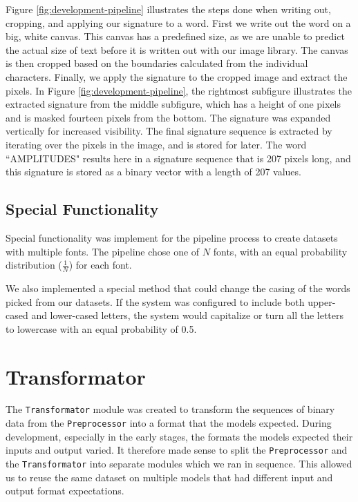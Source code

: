 Figure \ref{fig:development-pipeline} illustrates the steps done when writing out, cropping, and applying our signature to a word. First we write out the word on a big, white canvas. This canvas has a predefined size, as we are unable to predict the actual size of text before it is written out with our image library. The canvas is then cropped based on the boundaries calculated from the individual characters. Finally, we apply the signature to the cropped image and extract the pixels. In Figure \ref{fig:development-pipeline}, the rightmost subfigure illustrates the extracted signature from the middle subfigure, which has a height of one pixels and is masked fourteen pixels from the bottom. The signature was expanded vertically for increased visibility. The final signature sequence is extracted by iterating over the pixels in the image, and is stored for later. The word ``AMPLITUDES" results here in a signature sequence that is 207 pixels long, and this signature is stored as a binary vector with a length of 207 values.

\subsection{Special Functionality}
Special functionality was implement for the pipeline process to create datasets with multiple fonts. The pipeline chose one of \(N\) fonts, with an equal probability distribution (\(\frac{1}{N}\)) for each font.

We also implemented a special method that could change the casing of the words picked from our datasets. If the system was configured to include both upper-cased and lower-cased letters, the system would capitalize or turn all the letters to lowercase with an equal probability of 0.5.


\section{Transformator}
\label{sec:transformator}
The {\tt Transformator} module was created to transform the sequences of binary data from the {\tt Preprocessor} into a format that the models expected. During development, especially in the early stages, the formats the models expected their inputs and output varied. It therefore made sense to split the {\tt Preprocessor} and the {\tt Transformator} into separate modules which we ran in sequence. This allowed us to reuse the same dataset on multiple models that had different input and output format expectations.

